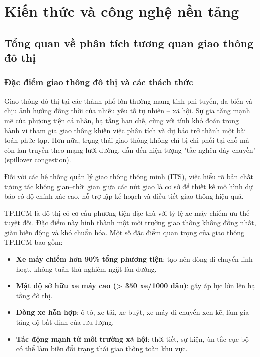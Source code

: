 \section{Kiến thức và công nghệ nền tảng}
\subsection{Tổng quan về phân tích tương quan giao thông đô thị}

\subsubsection{Đặc điểm giao thông đô thị và các thách thức}

Giao thông đô thị tại các thành phố lớn thường mang tính phi tuyến, đa biến và chịu ảnh hưởng đồng thời của nhiều yếu tố tự nhiên -- xã hội. Sự gia tăng mạnh mẽ của phương tiện cá nhân, hạ tầng hạn chế, cùng với tính khó đoán trong hành vi tham gia giao thông khiến việc phân tích và dự báo trở thành một bài toán phức tạp. Hơn nữa, trạng thái giao thông không chỉ bị chi phối tại chỗ mà còn lan truyền theo mạng lưới đường, dẫn đến hiện tượng "tắc nghẽn dây chuyền" (spillover congestion). 

Đối với các hệ thống quản lý giao thông thông minh (ITS), việc hiểu rõ bản chất tương tác không gian--thời gian giữa các nút giao là cơ sở để thiết kế mô hình dự báo có độ chính xác cao, hỗ trợ lập kế hoạch và điều tiết giao thông hiệu quả.


TP.HCM là đô thị có cơ cấu phương tiện đặc thù với tỷ lệ xe máy chiếm ưu thế tuyệt đối. Đặc điểm này hình thành một môi trường giao thông không đồng nhất, giàu biến động và khó chuẩn hóa. Một số đặc điểm quan trọng của giao thông TP.HCM bao gồm:

\begin{itemize}
    \item \textbf{Xe máy chiếm hơn 90\% tổng phương tiện}: tạo nên dòng di chuyển linh hoạt, không tuân thủ nghiêm ngặt làn đường.
    \item \textbf{Mật độ sở hữu xe máy cao (> 350 xe/1000 dân)}: gây áp lực lớn lên hạ tầng đô thị.
    \item \textbf{Dòng xe hỗn hợp}: ô tô, xe tải, xe buýt, xe máy di chuyển xen kẽ, làm gia tăng độ bất định của lưu lượng.
    \item \textbf{Tác động mạnh từ môi trường xã hội}: thời tiết, sự kiện, ùn tắc cục bộ có thể làm biến đổi trạng thái giao thông toàn khu vực.
\end{itemize}


